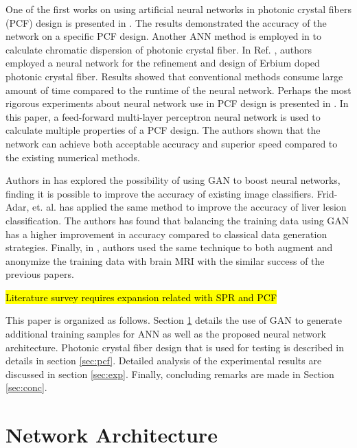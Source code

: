 \documentclass[10pt]{IEEEtran}
\begin{document}
One of the first works on using artificial neural networks in photonic crystal fibers (PCF) design is presented in \cite{hameed2008accurate}. The results demonstrated the accuracy of the network on a specific PCF design. Another ANN method is employed in \cite{rodriguez2010efficient} to calculate chromatic dispersion of photonic crystal fiber. In Ref. \cite{mescia2011refinement}, authors employed a neural network for the refinement and design of Erbium doped photonic crystal fiber. Results showed that conventional methods consume large amount of time compared to the runtime of the neural network. Perhaps the most rigorous experiments about neural network use in PCF design is presented in \cite{paper0}. In this paper, a feed-forward multi-layer perceptron neural network is used to calculate multiple properties of a PCF design. The authors shown that the network can achieve both acceptable accuracy and superior speed compared to the existing numerical methods.

Authors in \cite{perez2017effectiveness} has explored the possibility of using GAN to boost neural networks, finding it is possible to improve the accuracy of existing image classifiers. Frid-Adar, et. al. \cite{frid2018synthetic} has applied the same method to improve the accuracy of liver lesion classification. The authors has found that balancing the training data using GAN has a higher improvement in accuracy compared to classical data generation strategies. Finally, in \cite{shin2018medical}, authors used the same technique to both augment and anonymize the training data with brain MRI with the similar success of the previous papers.


\hl{Literature survey requires expansion related with SPR and PCF}

This paper is organized as follows. Section \ref{sec:prop} details the use of GAN to generate additional training samples for ANN as well as the proposed neural network architecture. Photonic crystal fiber design that is used for testing is described in details in section \ref{sec:pcf}. Detailed analysis of the experimental results are discussed in section \ref{sec:exp}. Finally, concluding remarks are made in Section \ref{sec:conc}.

\section{Network Architecture}
\label{sec:prop}
\end{document}

